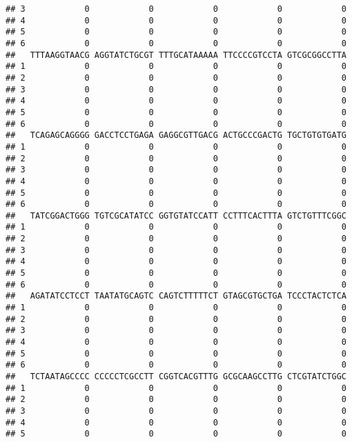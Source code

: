 \documentclass[]{article}
\begin{document}
\begin{verbatim}
## 3            0            0            0            0            0
## 4            0            0            0            0            0
## 5            0            0            0            0            0
## 6            0            0            0            0            0
##   TTTAAGGTAACG AGGTATCTGCGT TTTGCATAAAAA TTCCCCGTCCTA GTCGCGGCCTTA
## 1            0            0            0            0            0
## 2            0            0            0            0            0
## 3            0            0            0            0            0
## 4            0            0            0            0            0
## 5            0            0            0            0            0
## 6            0            0            0            0            0
##   TCAGAGCAGGGG GACCTCCTGAGA GAGGCGTTGACG ACTGCCCGACTG TGCTGTGTGATG
## 1            0            0            0            0            0
## 2            0            0            0            0            0
## 3            0            0            0            0            0
## 4            0            0            0            0            0
## 5            0            0            0            0            0
## 6            0            0            0            0            0
##   TATCGGACTGGG TGTCGCATATCC GGTGTATCCATT CCTTTCACTTTA GTCTGTTTCGGC
## 1            0            0            0            0            0
## 2            0            0            0            0            0
## 3            0            0            0            0            0
## 4            0            0            0            0            0
## 5            0            0            0            0            0
## 6            0            0            0            0            0
##   AGATATCCTCCT TAATATGCAGTC CAGTCTTTTTCT GTAGCGTGCTGA TCCCTACTCTCA
## 1            0            0            0            0            0
## 2            0            0            0            0            0
## 3            0            0            0            0            0
## 4            0            0            0            0            0
## 5            0            0            0            0            0
## 6            0            0            0            0            0
##   TCTAATAGCCCC CCCCCTCGCCTT CGGTCACGTTTG GCGCAAGCCTTG CTCGTATCTGGC
## 1            0            0            0            0            0
## 2            0            0            0            0            0
## 3            0            0            0            0            0
## 4            0            0            0            0            0
## 5            0            0            0            0            0

\end{verbatim}
\end{document}
